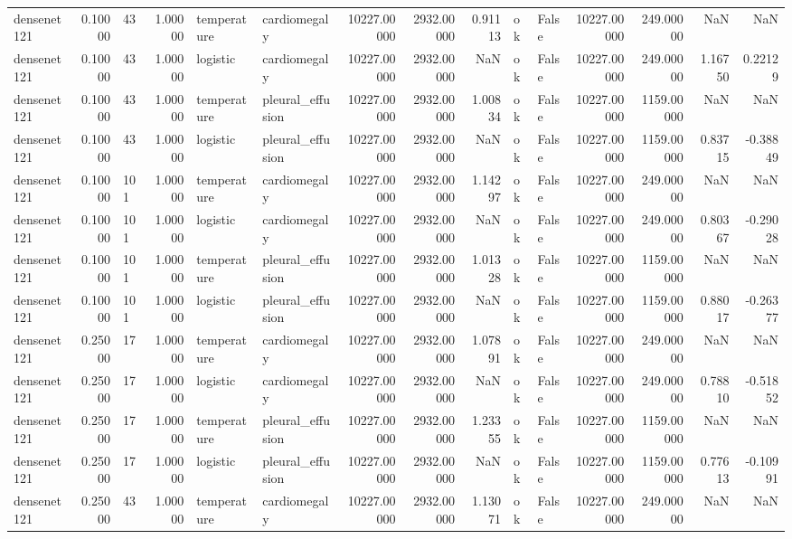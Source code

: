 \begin{tabular}{lrlrllrrrllrrrr}
densenet121 & 0.10000 & 43 & 1.00000 & temperature & cardiomegaly & 10227.00000 & 2932.00000 & 0.91113 & ok & False & 10227.00000 & 249.00000 & NaN & NaN \\
densenet121 & 0.10000 & 43 & 1.00000 & logistic & cardiomegaly & 10227.00000 & 2932.00000 & NaN & ok & False & 10227.00000 & 249.00000 & 1.16750 & 0.22129 \\
densenet121 & 0.10000 & 43 & 1.00000 & temperature & pleural\_effusion & 10227.00000 & 2932.00000 & 1.00834 & ok & False & 10227.00000 & 1159.00000 & NaN & NaN \\
densenet121 & 0.10000 & 43 & 1.00000 & logistic & pleural\_effusion & 10227.00000 & 2932.00000 & NaN & ok & False & 10227.00000 & 1159.00000 & 0.83715 & -0.38849 \\
densenet121 & 0.10000 & 101 & 1.00000 & temperature & cardiomegaly & 10227.00000 & 2932.00000 & 1.14297 & ok & False & 10227.00000 & 249.00000 & NaN & NaN \\
densenet121 & 0.10000 & 101 & 1.00000 & logistic & cardiomegaly & 10227.00000 & 2932.00000 & NaN & ok & False & 10227.00000 & 249.00000 & 0.80367 & -0.29028 \\
densenet121 & 0.10000 & 101 & 1.00000 & temperature & pleural\_effusion & 10227.00000 & 2932.00000 & 1.01328 & ok & False & 10227.00000 & 1159.00000 & NaN & NaN \\
densenet121 & 0.10000 & 101 & 1.00000 & logistic & pleural\_effusion & 10227.00000 & 2932.00000 & NaN & ok & False & 10227.00000 & 1159.00000 & 0.88017 & -0.26377 \\
densenet121 & 0.25000 & 17 & 1.00000 & temperature & cardiomegaly & 10227.00000 & 2932.00000 & 1.07891 & ok & False & 10227.00000 & 249.00000 & NaN & NaN \\
densenet121 & 0.25000 & 17 & 1.00000 & logistic & cardiomegaly & 10227.00000 & 2932.00000 & NaN & ok & False & 10227.00000 & 249.00000 & 0.78810 & -0.51852 \\
densenet121 & 0.25000 & 17 & 1.00000 & temperature & pleural\_effusion & 10227.00000 & 2932.00000 & 1.23355 & ok & False & 10227.00000 & 1159.00000 & NaN & NaN \\
densenet121 & 0.25000 & 17 & 1.00000 & logistic & pleural\_effusion & 10227.00000 & 2932.00000 & NaN & ok & False & 10227.00000 & 1159.00000 & 0.77613 & -0.10991 \\
densenet121 & 0.25000 & 43 & 1.00000 & temperature & cardiomegaly & 10227.00000 & 2932.00000 & 1.13071 & ok & False & 10227.00000 & 249.00000 & NaN & NaN \\

\end{tabular}
